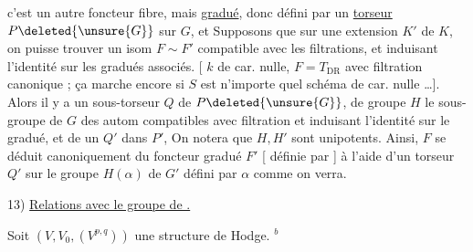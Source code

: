 c'est un autre foncteur fibre, mais \uline{gradué},
donc défini par un \uline{torseur} $P\deleted{\unsure{G}}$ sur $G$, et
Supposons que sur  une extension
$K'$ de $K$, on puisse trouver un isom
$F\sim F'$ compatible avec les filtrations, et
induisant l'identité sur les gradués associés.
[  $k$ de car. nulle,
$F=T_{\mathrm{DR}}$ avec filtration
canonique ; ça marche encore si $S$ est n'importe
quel schéma  de car. nulle \dots].
Alors
il y a un sous-torseur  $Q$ de $P\deleted{\unsure{G}}$, de
groupe $H$ le sous-groupe de $G$ des autom
compatibles avec filtration et induisant l'identité
sur le gradué, et de   un $Q'$ dans
$P'$, 
On notera que $H,H'$ sont unipotents. Ainsi,
$F$ se déduit canoniquement du foncteur
gradué $F'$ [ définie par
]
à l'aide d'un torseur $Q'$ sur le groupe
 $H(\alpha)$ de $G'$ défini par $\alpha$ comme on verra.


13) \uline{Relations avec le groupe de
.}


Soit $(V,V_0,(V^{p,q}))$ une structure de Hodge. $^{b}$


